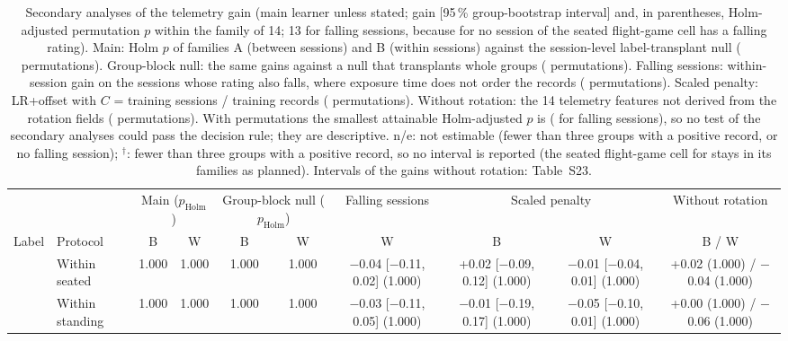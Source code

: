 \begin{table}[ht]
\centering
\scriptsize
\caption{Secondary analyses of the telemetry gain (main learner unless stated; gain [95\,\% group-bootstrap interval] and, in parentheses, Holm-adjusted permutation $p$ within the family of 14; 13 for falling sessions, because for \sevone{} no session of the seated flight-game cell has a falling rating). Main: Holm $p$ of families A (between sessions) and B (within sessions) against the session-level label-transplant null ( permutations). Group-block null: the same gains against a null that transplants whole groups ( permutations). Falling sessions: within-session gain on the sessions whose rating also falls, where exposure time does not order the records ( permutations). Scaled penalty: LR+offset with $C$ = training sessions / training records ( permutations). Without rotation: the 14 telemetry features not derived from the rotation fields ( permutations). With  permutations the smallest attainable Holm-adjusted $p$ is  ( for falling sessions), so no test of the secondary analyses could pass the decision rule; they are descriptive. n/e: not estimable (fewer than three groups with a positive record, or no falling session); $^\dagger$: fewer than three groups with a positive record, so no interval is reported (the seated flight-game cell for \sevtwo{} stays in its families as planned). Intervals of the gains without rotation: Table~S23.}
\label{tab:supp_secondary}
\setlength{\tabcolsep}{2pt}
\begin{tabular}{@{}llcccccccc@{}}
\toprule
 & & \multicolumn{2}{c}{Main ($p_\mathrm{Holm}$)} & \multicolumn{2}{c}{Group-block null ($p_\mathrm{Holm}$)} & Falling sessions & \multicolumn{2}{c}{Scaled penalty} & Without rotation \\
\cmidrule(lr){3-4}\cmidrule(lr){5-6}\cmidrule(lr){7-7}\cmidrule(lr){8-9}\cmidrule(lr){10-10}
Label & Protocol & B & W & B & W & W & B & W & B / W \\
\midrule
\sevtwo{} & Within seated & 1.000 & 1.000 & 1.000 & 1.000 & $-$0.04 [$-$0.11, 0.02] (1.000) & +0.02 [$-$0.09, 0.12] (1.000) & $-$0.01 [$-$0.04, 0.01] (1.000) & +0.02 (1.000) / $-$0.04 (1.000) \\
 & Within standing & 1.000 & 1.000 & 1.000 & 1.000 & $-$0.03 [$-$0.11, 0.05] (1.000) & $-$0.01 [$-$0.19, 0.17] (1.000) & $-$0.05 [$-$0.10, 0.01] (1.000) & +0.00 (1.000) / $-$0.06 (1.000) \\

\end{tabular}
\end{table}
